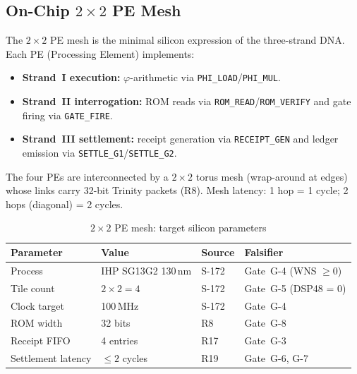 

\subsection{On-Chip $2{\times}2$ PE Mesh}
\label{sec74:pe-mesh}

The $2{\times}2$ PE mesh is the minimal silicon expression of the
three-strand DNA.  Each PE (Processing Element) implements:
\begin{itemize}
  \item \textbf{Strand~I execution:} $\varphi$-arithmetic via
    \texttt{PHI\_LOAD}/\texttt{PHI\_MUL}.
  \item \textbf{Strand~II interrogation:} ROM reads via
    \texttt{ROM\_READ}/\texttt{ROM\_VERIFY} and gate firing via
    \texttt{GATE\_FIRE}.
  \item \textbf{Strand~III settlement:} receipt generation via
    \texttt{RECEIPT\_GEN} and ledger emission via
    \texttt{SETTLE\_G1}/\texttt{SETTLE\_G2}.
\end{itemize}

The four PEs are interconnected by a $2{\times}2$ torus mesh (wrap-around
at edges) whose links carry 32-bit Trinity packets (R8).  Mesh latency:
1 hop = 1 cycle; 2 hops (diagonal) = 2 cycles.

\begin{table}[H]
\centering
\caption{$2{\times}2$ PE mesh: target silicon parameters}
\label{tab74:pe-mesh}
\small
\begin{tabular}{llll}
\toprule
Parameter & Value & Source & Falsifier \\
\midrule
Process        & IHP SG13G2 130\,nm & S-172 & Gate~G-4 (WNS $\geq 0$) \\
Tile count     & $2 \times 2 = 4$   & S-172 & Gate~G-5 (DSP48 = 0) \\
Clock target   & 100\,MHz           & S-172 & Gate~G-4 \\
ROM width      & 32 bits            & R8    & Gate~G-8 \\
Receipt FIFO   & 4 entries          & R17   & Gate~G-3 \\
Settlement latency & $\leq 2$ cycles & R19  & Gate~G-6, G-7 \\
\bottomrule
\end{tabular}
\end{table}

